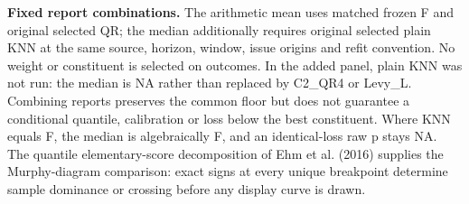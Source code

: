 \documentclass[11pt,a4paper]{article}
\begin{document}
\textbf{Fixed report combinations.} The arithmetic mean uses matched frozen F and original selected QR; the median additionally requires original selected plain KNN at the same source, horizon, window, issue origins and refit convention. No weight or constituent is selected on outcomes. In the added panel, plain KNN was not run: the median is NA rather than replaced by C2\_QR4 or Levy\_L. Combining reports preserves the common floor but does not guarantee a conditional quantile, calibration or loss below the best constituent. Where KNN equals F, the median is algebraically F, and an identical-loss raw p stays NA. The quantile elementary-score decomposition of Ehm et al. (2016) supplies the Murphy-diagram comparison: exact signs at every unique breakpoint determine sample dominance or crossing before any display curve is drawn.
\end{document}
